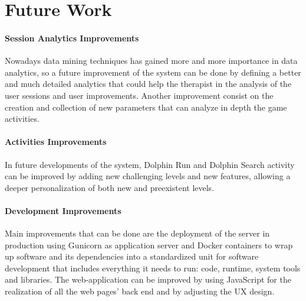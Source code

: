 	\chapter{Future Work}
	
	\subsubsection{\textbf{\Large Session Analytics Improvements}}
	Nowadays data mining techniques has gained more and more importance in data analytics, so a future improvement of the system can be done by defining a better and much detailed analytics that could help the therapist in the analysis of the user sessions and user improvements. \newline
	Another improvement consist on the creation and collection of new parameters that can analyze in depth the game activities.
	
	
	\subsubsection{\textbf{\Large Activities Improvements}}
	In future developments of the system, Dolphin Run and Dolphin Search activity can be improved by adding new challenging levels and new features, allowing a deeper personalization of both new and preexistent levels.
	
	\subsubsection{\textbf{\Large Development Improvements}}
	Main improvements that can be done are the deployment of the server in production using Gunicorn as application server and Docker containers to wrap up software and its dependencies into a standardized unit for software development that includes everything it needs to run: code, runtime, system tools and libraries. \newline
	The web-application can be improved by using JavaScript for the realization of all the web pages' back end and by adjusting the UX design.
	


	
	
	